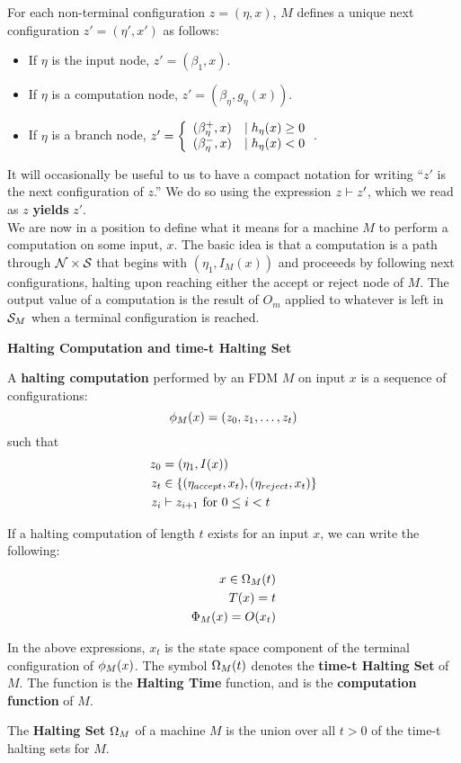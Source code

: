 For each non-terminal configuration $z = (\eta, x)$, $M$ defines a
unique next configuration $z' = (\eta', x')$ as follows:

\begin{itemize}
\item If $\eta$ is the input node, $z' = (\beta_{1}, x)$.
\item If $\eta$ is a computation node, $z' = (\beta_{\eta}, g_\eta(x))$.
\item If $\eta$ is a branch node, $z' = \left\{ \begin{array}{ll} (\beta_\eta^+,
    x) & \mid h_\eta(x) \geq 0 \\ (\beta_\eta^-, x) & \mid h_\eta(x) < 0 \end{array} \right.$.
\end{itemize}

It will occasionally be useful to us to have a compact notation for
writing ``$z'$ is the next configuration of $z$.''  We do so using the
expression $z \vdash z'$, which we read as $z$ \textbf{yields} $z'$.\\

We are now in a position to define what it means for a machine $M$ to
perform a computation on some input, $x$.  The basic idea is that a
computation is a path through $\mathcal{N} \times \mathcal{S}$ that begins
with $(\eta_1, I_M(x))$ and proceeeds by following next
configurations, halting upon reaching either the accept or reject node
of $M$.  The output value of a computation is the result of $O_m$
applied to whatever is left in $\mathcal{S}_M$ when a terminal
configuration is reached.\\

\begin{definition}{\textbf{Halting Computation and time-t Halting Set}}

  A \textbf{halting computation} performed by an FDM $M$ on input $x$
  is a sequence of configurations: 
  $$\phi_M(x) = (z_0, z_1, \ldots, z_t)$$ such that
  \begin{align*}
    z_0 &= (\eta_1, I(x))\\
    z_t &\in \{(\eta_{accept}, x_t), (\eta_{reject}, x_t)\}\\
    z_i &\vdash z_{i+1} \text{ for } 0 \leq i < t
  \end{align*}
  
  If a halting computation of length $t$ exists for an input $x$, we
  can write the following:

  \begin{align*}
    x \in \Omega_M(t)\\
    T(x) = t\\
    \Phi_M(x) = O(x_t)
  \end{align*}

  In the above expressions, $x_t$ is the state space component of the
  terminal configuration of $\phi_M(x)$.  The symbol
  $\Omega_M(t)$ denotes the \textbf{time-t Halting Set} of $M$.  The
  function  is the \textbf{Halting
    Time} function, and
   is the
  \textbf{computation function} of $M$.  

  The \textbf{Halting Set} $\Omega_M$ of a machine $M$ is the union
  over all $t > 0$ of the time-t halting sets for $M$.

\end{definition}

